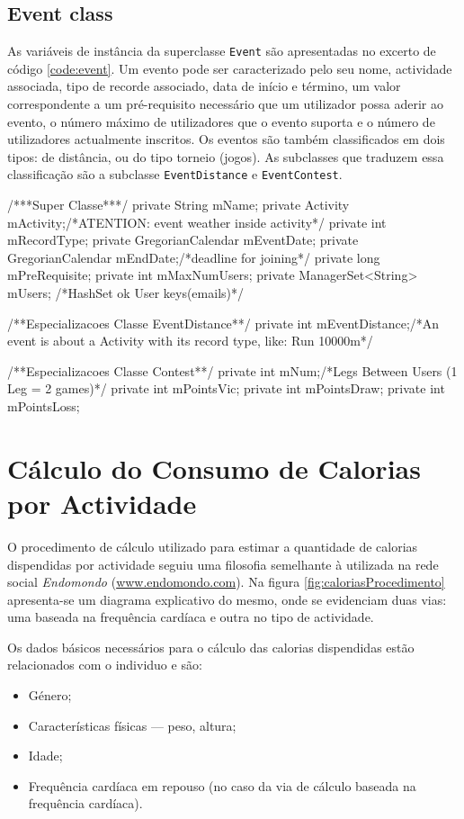 \documentclass[a4paper,10pt]{report}
\begin{document}
\section{Event class}
\label{sec:event}
As variáveis de instância da superclasse \verb!Event! são apresentadas no excerto de código \ref{code:event}.
Um evento pode ser caracterizado pelo seu nome, actividade associada, tipo de recorde associado, 
data de início e término, um valor correspondente a um pré-requisito necessário que um utilizador possa aderir ao evento, 
o número máximo de utilizadores que o evento suporta e o número de utilizadores actualmente inscritos.
Os eventos são também classificados em dois tipos: de distância, ou do tipo torneio (jogos).
As subclasses que traduzem essa classificação são a subclasse \verb!EventDistance! e \verb!EventContest!.

\begin{code}[caption=Variáveis de instância da superclasse Event e subclasses respectivas (src/model/event)., label=code:event]
/***Super Classe***/
private String mName;
private Activity mActivity;/*ATENTION: event weather inside activity*/
private int mRecordType;
private GregorianCalendar mEventDate;
private GregorianCalendar mEndDate;/*deadline for joining*/
private long mPreRequisite;
private int mMaxNumUsers;
private ManagerSet<String> mUsers; /*HashSet ok User keys(emails)*/

/**Especializacoes Classe EventDistance**/
private int mEventDistance;/*An event is about a Activity with its record type, like: Run 10000m*/

/**Especializacoes Classe Contest**/
private int mNum;/*Legs Between Users (1 Leg = 2 games)*/
private int mPointsVic;
private int mPointsDraw;
private int mPointsLoss;
\end{code}

\chapter{Cálculo do Consumo de Calorias por Actividade}
\label{cap:calorias}
O procedimento de cálculo utilizado para estimar a quantidade de calorias dispendidas por actividade seguiu uma filosofia semelhante à utilizada 
na rede social \emph{Endomondo} (\url{www.endomondo.com}). 
Na figura \ref{fig:caloriasProcedimento} apresenta-se um diagrama explicativo do mesmo, onde se evidenciam duas vias: uma baseada na frequência 
cardíaca e outra no tipo de actividade.

Os dados básicos necessários para o cálculo das calorias dispendidas estão relacionados com o individuo e são:
\begin{itemize}
 \item Género;
 \item Características físicas --- peso, altura;
 \item Idade;
 \item Frequência cardíaca em repouso (no caso da via de cálculo baseada na frequência cardíaca).
\end{itemize}
\end{document}
